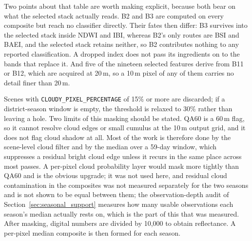 \documentclass[conference]{IEEEtran}
\begin{document}
Two points about that table are worth making explicit, because both bear on what the selected stack actually reads. B2 and B3 are computed on every composite but reach no classifier directly. Their fates then differ: B3 survives into the selected stack inside NDWI and IBI, whereas B2's only routes are BSI and BAEI, and the selected stack retains neither, so B2 contributes nothing to any reported classification. A dropped index does not pass its ingredients on to the bands that replace it. And five of the nineteen selected features derive from B11 or B12, which are acquired at 20\,m, so a 10\,m pixel of any of them carries no detail finer than 20\,m.

Scenes with \texttt{CLOUDY\_PIXEL\_PERCENTAGE} of 15\% or more are discarded; if a district-season window is empty, the threshold is relaxed to 30\% rather than leaving a hole. Two limits of this masking should be stated. QA60 is a 60\,m flag, so it cannot resolve cloud edges or small cumulus at the 10\,m output grid, and it does not flag cloud shadow at all. Most of the work is therefore done by the scene-level cloud filter and by the median over a 59-day window, which suppresses a residual bright cloud edge unless it recurs in the same place across most passes. A per-pixel cloud probability layer would mask more tightly than QA60 and is the obvious upgrade; it was not used here, and residual cloud contamination in the composites was not measured separately for the two seasons and is not shown to be equal between them; the observation-depth audit of Section~\ref{sec:seasonal_support} measures how many usable observations each season's median actually rests on, which is the part of this that was measured. After masking, digital numbers are divided by 10,000 to obtain reflectance. A per-pixel median composite is then formed for each season.
\end{document}
